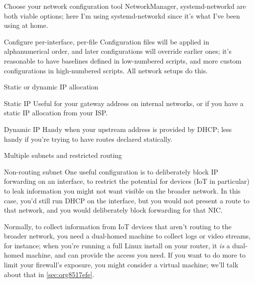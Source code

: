 \documentclass[bigger]{beamer}
\begin{document}
\begin{frame}[label={sec:org8d7dd3d}]{Choose your network configuration tool}
NetworkManager, systemd-networkd are both viable options; here I'm using
systemd-networkd since it's what I've been using at home.

\begin{block}{Configure per-interface, per-file}
Configuration files will be applied in alphanumerical order, and later
configurations will override earlier ones; it's reasonable to have
baselines defined in low-numbered scripts, and more custom configurations
in high-numbered scripts. All network setups do this.
\end{block}


\begin{block}{Static or dynamic IP allocation}
\begin{block}{Static IP}
Useful for your gateway address on internal networks, or if you have a
static IP allocation from your ISP.
\end{block}

\begin{block}{Dynamic IP}
Handy when your upstream address is provided by DHCP; less handy if you're
trying to have routes declared statically.
\end{block}
\end{block}
\end{frame}

\begin{frame}[label={sec:org3a006ff}]{Multiple subnets and restricted routing}
\begin{block}{Non-routing subnet}
One useful configuration is to deliberately block IP forwarding on an
interface, to restrict the potential for devices (IoT in particular) to
leak information you might not want visible on the broader network. In this
case, you'd still run DHCP on the interface, but you would not present a
route to that network, and you would deliberately block forwarding for that
NIC.

Normally, to collect information from IoT devices that aren't routing to
the broader network, you need a dual-homed machine to collect logs or video
streams, for instance; when you're running a full Linux install on your
router, it \emph{is} a dual-homed machine, and can provide the access you
need. If you want to do more to limit your firewall's exposure, you might
consider a virtual machine; we'll talk about that in \ref{sec:org8517efe}.
\end{block}
\end{frame}
\end{document}
